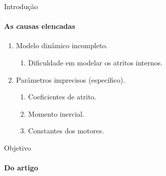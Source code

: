 \begin{frame}[t]{Introdução}
  \framesubtitle{As causas elencadas}
  \transdissolve[duration=0.5]
  \begin{enumerate}
    \item Modelo dinâmico incompleto.
    \begin{enumerate}
      \item Dificuldade em modelar os atritos internos.
    \end{enumerate}

    \item Parâmetros imprecisos (específico).
    \begin{enumerate}
      \item Coeficientes de atrito.
      \item Momento inercial.
      \item Constantes dos motores.
    \end{enumerate}
  \end{enumerate}

\end{frame}

\begin{frame}[c]{Objetivo}
  \framesubtitle{Do artigo}
  \transdissolve[duration=0.5]

  \begin{center}
  \end{center}


\end{frame}

